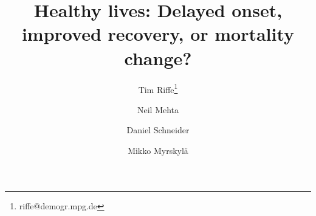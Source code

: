 \newcommand{\absdiv}[1]{%
  \par\addvspace{.5\baselineskip}%
  \noindent\textbf{#1}\quad\ignorespaces
}






\title{Healthy lives: Delayed onset, improved recovery, or mortality
change?}

\author[1]{Tim Riffe\thanks{riffe@demogr.mpg.de}}
\author[2]{Neil Mehta}
\author[1]{Daniel Schneider}
\author[1,3]{Mikko Myrskyl\"a}



%              
%

